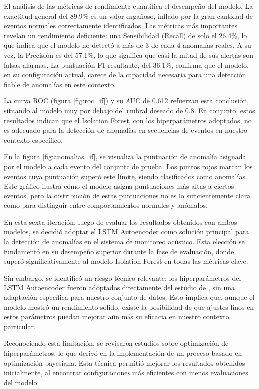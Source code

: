 El análisis de las métricas de rendimiento cuantifica el desempeño del modelo. La exactitud general del 89.9\% es un valor engañoso, inflado por la gran cantidad de eventos normales correctamente identificados. Las métricas más importantes revelan un rendimiento deficiente: una Sensibilidad (Recall) de solo el 26.4\%, lo que indica que el modelo no detectó a más de 3 de cada 4 anomalías reales. A su vez, la Precisión es del 57.1\%, lo que significa que casi la mitad de sus alertas son falsas alarmas. La puntuación F1 resultante, del 36.1\%, confirma que el modelo, en su configuración actual, carece de la capacidad necesaria para una detección fiable de anomalías en este contexto.

La curva ROC (figura \ref{fig:roc_if}) y su AUC de 0.612 refuerzan esta conclusión, situando al modelo muy por debajo del umbral deseado de 0.8. En conjunto, estos resultados indican que el Isolation Forest, con los hiperparámetros adoptados, no es adecuado para la detección de anomalías en secuencias de eventos en nuestro contexto específico.

En la figura \ref{fig:anomalias_if}, se visualiza la puntuación de anomalía asignada por el modelo a cada evento del conjunto de prueba. Los puntos rojos marcan los eventos cuya puntuación superó este límite, siendo clasificados como anomalías. Este gráfico ilustra cómo el modelo asigna puntuaciones más altas a ciertos eventos, pero la distribución de estas puntuaciones no es lo suficientemente clara como para distinguir   entre comportamientos normales y anómalos.


      En esta sexta iteración, luego de evaluar los resultados obtenidos con ambos modelos, se decidió adoptar el LSTM Autoencoder como solución principal para la detección de anomalías en el sistema de monitoreo acústico. Esta elección se fundamentó en su desempeño superior durante la fase de evaluación, donde superó significativamente al modelo Isolation Forest en todas las métricas clave.

      Sin embargo, se identificó un riesgo técnico relevante: los hiperparámetros del LSTM Autoencoder fueron adoptados directamente del estudio de \citeauthor{reis2025edge} \citeyear{reis2025edge}, sin una adaptación específica para nuestro conjunto de datos. Esto implica que, aunque el modelo mostró un rendimiento sólido, existe la posibilidad de que ajustes finos en estos parámetros puedan mejorar aún más su eficacia en nuestro contexto particular.

      Reconociendo esta limitación, se revisaron estudios sobre optimización de hiperparámetros, lo que derivó en la implementación de un proceso basado en optimización bayesiana. Esta técnica permitió mejorar los resultados obtenidos inicialmente, al encontrar configuraciones más eficientes con menos evaluaciones del modelo.

